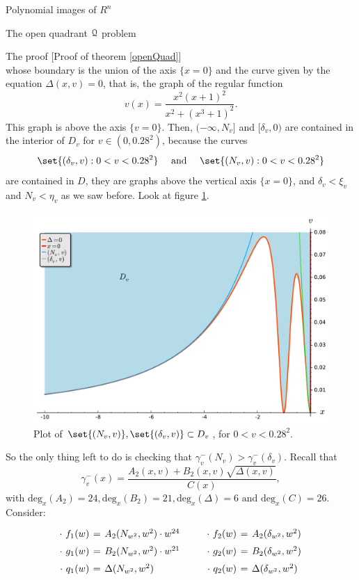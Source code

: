 \documentclass[11pt, a4paper, english, twoside, notitlepage, openright]{report}
\begin{document}
\begin{chapter}{Polynomial images of $R^n$}
\begin{section}{The open quadrant $\mathcal{Q}$ problem}
\begin{subsection}{The proof} [Proof of theorem \ref{openQuad}]
$$$$ 
whose boundary is the union of the axis $\{x=0\}$ and the curve given by the equation $\Delta(x,v)=0$, that is, the graph of the regular function
$$
v(x)=\frac{x^2(x+1)^2}{x^2+(x^3+1)^2}.
$$
This graph is above the axis $\{v=0\}$. Then, $(-\infty,N_v]$ and $[\delta_v,0)$ are contained in the interior of $D_v$ for $v\in (0, 0.28^2)$, because the curves 
$$
\set{(\delta_v,v):0<v<0.28^2} \quad\text{ and }\quad \set{(N_v,v):0<v<0.28^2}
$$ 
are contained in $D$, they are graphs above the vertical axis $\{x=0\}$, and $\delta_v<\xi_v$ and $N_v<\eta_v$ as we saw before. Look at figure \ref{fig:nice_plot}.

\begin{figure}[h]
\centering
\includegraphics[width=1\textwidth]{plots/ch1_15_nice_plot.pdf}
\caption{Plot of $\set{(N_v, v)}, \set{(\delta_v,v)}\subset D_v$, for $0<v<0.28^2$.\label{fig:nice_plot}}
\end{figure}
So the only thing left to do is checking that $\gamma_v^-(N_v)>\gamma_v^-(\delta_v)$. Recall that 
$$
\gamma_v^-(x)=\dfrac{A_2(x,v)+B_2(x,v)\sqrt{\Delta(x,v)}}{C(x)},
$$
with $\text{deg}_x(A_2)=24,\text{deg}_x(B_2)=21, \text{deg}_x(\Delta)=6 \text{ and }\text{deg}_x(C)=26$. Consider:
$$
\arraycolsep=2pt\def\arraystretch{1.5}
\begin{array}{rclcrcl}
\cdot\ f_1(w)&=&A_2(N_{w^2},w^2)\cdot w^{24}& \qquad &\cdot\ f_2(w)&=& A_2(\delta_{w^2},w^2)\\
\cdot\ g_1(w)&=&B_2(N_{w^2},w^2)\cdot w^{21}& \qquad &\cdot\ g_2(w)&=&B_2(\delta_{w^2},w^2)\\
\cdot\ q_1(w)&=&\Delta(N_{w^2},w^2)& \qquad &\cdot\ q_2(w)&=&\Delta(\delta_{w^2},w^2)\\

\end{array}$$
\end{subsection}
\end{section}
\end{chapter}
\end{document}
